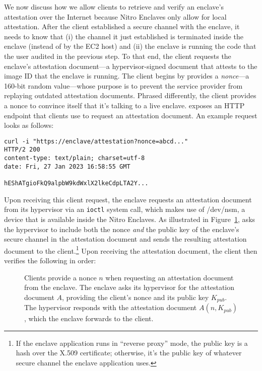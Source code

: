 We now discuss how we allow clients to retrieve and verify an enclave's
attestation over the Internet because Nitro Enclaves only allow for local
attestation.  After the client established a secure channel with the enclave, it
needs to know that (i) the channel it just established is terminated inside the
enclave (instead of by the EC2 host) and (ii) the enclave is running the code
that the user audited in the previous step.  To that end, the client requests
the enclave's attestation document---a hypervisor-signed document that attests
to the image ID that the enclave is running.  The client begins by provides a
\emph{nonce}---a 160-bit random value---whose purpose is to prevent the service
provider from replaying outdated attestation documents.  Phrased differently,
the client provides a nonce to convince itself that it's talking to a live
enclave.  \Tool{} exposes an HTTP endpoint that clients use to request an
attestation document.  An example request looks as follows:

\begin{lstlisting}[numbers=none,basicstyle=\small\ttfamily]
curl -i "https://enclave/attestation?nonce=abcd..."
HTTP/2 200
content-type: text/plain; charset=utf-8
date: Fri, 27 Jan 2023 16:58:55 GMT

hEShATgioFkQ9alpbW9kdWxlX2lkeCdpLTA2Y...
\end{lstlisting}

Upon receiving this client request, the enclave requests an attestation document
from its hypervisor via an \texttt{ioctl} system call, which makes use of
/dev/nsm, a device that is available inside the Nitro Enclaves.  As
illustrated in Figure~\ref{fig:attestation}, \tool{} asks the hypervisor
to include both the nonce \emph{and} the public key of the enclave's secure
channel in the attestation document and sends the resulting attestation document
to the client.\footnote{If the enclave application runs in ``reverse proxy''
mode, the public key is a hash over the X.509 certificate; otherwise, it's the
public key of whatever secure channel the enclave application uses.}  Upon
receiving the attestation document, the client then verifies the following in
order:

\begin{figure}[t]
  \centering
  
  \caption{Clients provide a nonce $n$ when requesting an attestation document
  from the enclave.  The enclave asks its hypervisor for the attestation
  document $A$, providing the client's nonce and its public key $K_{pub}$.  The
  hypervisor responds with the attestation document $A(n, K_{pub})$, which the
  enclave forwards to the client.}%
  \label{fig:attestation}
\end{figure}

